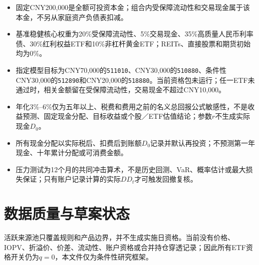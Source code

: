 \begin{itemize}
  \item 固定CNY200,000是全额可投资本金；组合内受保障流动性和交易现金属于该本金，不另从家庭资产负债表扣减。
  \item 基准稳健核心权重为20\%受保障流动性、5\%交易现金、35\%高质量人民币利率债、30\%红利权益ETF和10\%非杠杆黄金ETF；REITs、直接股票和期货初始均为0\%。
  \item 指定模型目标为CNY70,000的\texttt{511010}、CNY30,000的\texttt{510880}、条件性CNY30,000的\texttt{512890}和CNY20,000的\texttt{518880}。当前资格包未运行；任一ETF未通过时，相关金额留在受保障流动性，交易现金不超过CNY10,000。
  \item 年化3\%--6\%仅为五年以上、税费和费用之前的名义总回报公式敏感性，不是收益预测、固定现金分配、目标收益或个股／ETF估值结论；参数$r$不生成实际现金$D_0$。
  \item 所有现金分配以实际税后、扣费后到账额$D_0$记录并默认再投资；不预测第一年现金、十年累计分配或可消费金额。
  \item 压力测试为12个月的共同冲击算术，不是历史回测、VaR、概率估计或最大损失保证；只有账户记录计算的实际$DD_t$才可触发回撤复核。
\end{itemize}

\section{数据质量与草案状态}

活跃来源池只覆盖规则和产品边界，并不生成实施日资格。当前没有价格、IOPV、折溢价、价差、流动性、账户资格或合并持仓穿透记录；因此所有ETF资格开关仍为$q=0$，本文件仅为条件性研究框架。
